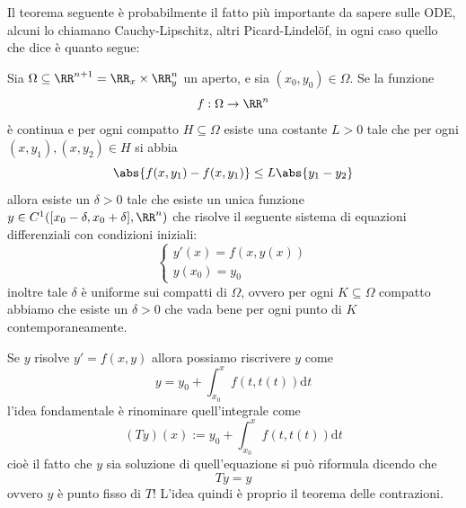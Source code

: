 \documentclass[11pt]{scrartcl}
\newcommand{\dif}{\text{d}}
\begin{document}
	Il teorema seguente è probabilmente il fatto più importante da sapere sulle ODE, alcuni lo chiamano Cauchy-Lipschitz, altri Picard-Lindel\"of, in ogni caso quello che dice è quanto segue:
	\begin{theorem}
		Sia $\Omega\subseteq\RR^{n+1}=\RR_x\times \RR_y^n$ un aperto, e sia $(x_0,y_0)\in \Omega$. Se la funzione 
		$$f:\Omega\to \RR^n$$
		è continua e per ogni compatto $H\subseteq \Omega$ esiste una costante $L>0$ tale che per ogni $(x,y_1),(x,y_2)\in H$ si abbia
		$$\abs{f(x,y_1)-f(x,y_1)}\le L\abs{y_1-y_2}$$
		allora esiste un $\delta>0$ tale che esiste un unica funzione $y\in C^1([x_0-\delta,x_0+\delta],\RR^n)$ che risolve il seguente sistema di equazioni differenziali con condizioni iniziali:
		$$
		\begin{cases}
			y'(x) = f(x,y(x)) \\
			y(x_0)=y_0
		\end{cases}
		$$
		inoltre tale $\delta$ è uniforme sui compatti di $\Omega$, ovvero per ogni $K\subseteq\Omega$ compatto abbiamo che esiste un $\delta>0$ che vada bene per ogni punto di $K$ contemporaneamente.
	\end{theorem}
	\begin{remark}
		Se $y$ risolve $y'=f(x,y)$ allora possiamo riscrivere $y$ come
		$$y=y_0+\int_{x_0}^x f(t,t(t))\dif t$$
		l'idea fondamentale è rinominare quell'integrale come
		$$(Ty)(x):=y_0+\int_{x_0}^x f(t,t(t))\dif t$$
		cioè il fatto che $y$ sia soluzione di quell'equazione si può riformula dicendo che
		$$Ty=y$$
		ovvero $y$ è punto fisso di $T$! L'idea quindi è proprio il teorema delle contrazioni.
	\end{remark}
\end{document}
